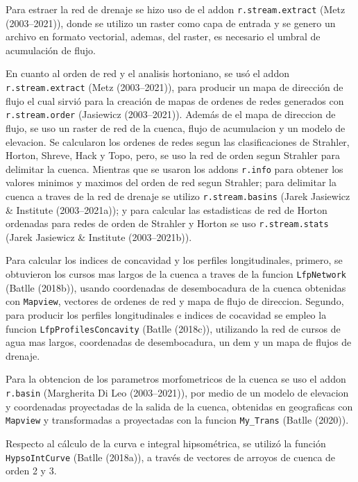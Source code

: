 \documentclass[11pt,]{article}
\begin{document}
Para estraer la red de drenaje se hizo uso de el addon
\texttt{r.stream.extract} (Metz (2003--2021)), donde se utilizo un
raster como capa de entrada y se genero un archivo en formato vectorial,
ademas, del raster, es necesario el umbral de acumulación de flujo.

En cuanto al orden de red y el analisis hortoniano, se usó el addon
\texttt{r.stream.extract} (Metz (2003--2021)), para producir un mapa de
dirección de flujo el cual sirvió para la creación de mapas de ordenes
de redes generados con \texttt{r.stream.order} (Jasiewicz (2003--2021)).
Además de el mapa de direccion de flujo, se uso un raster de red de la
cuenca, flujo de acumulacion y un modelo de elevacion. Se calcularon los
ordenes de redes segun las clasificaciones de Strahler, Horton, Shreve,
Hack y Topo, pero, se uso la red de orden segun Strahler para delimitar
la cuenca. Mientras que se usaron los addons \texttt{r.info} para
obtener los valores minimos y maximos del orden de red segun Strahler;
para delimitar la cuenca a traves de la red de drenaje se utilizo
\texttt{r.stream.basins} (Jarek Jasiewicz \& Institute (2003--2021a)); y
para calcular las estadisticas de red de Horton ordenadas para redes de
orden de Strahler y Horton se uso \texttt{r.stream.stats} (Jarek
Jasiewicz \& Institute (2003--2021b)).

Para calcular los indices de concavidad y los perfiles longitudinales,
primero, se obtuvieron los cursos mas largos de la cuenca a traves de la
funcion \texttt{LfpNetwork} (Batlle (2018b)), usando coordenadas de
desembocadura de la cuenca obtenidas con \texttt{Mapview}, vectores de
ordenes de red y mapa de flujo de direccion. Segundo, para producir los
perfiles longitudinales e indices de cocavidad se empleo la funcion
\texttt{LfpProfilesConcavity} (Batlle (2018c)), utilizando la red de
cursos de agua mas largos, coordenadas de desembocadura, un dem y un
mapa de flujos de drenaje.

Para la obtencion de los parametros morfometricos de la cuenca se uso el
addon \texttt{r.basin} (Margherita Di Leo (2003--2021)), por medio de un
modelo de elevacion y coordenadas proyectadas de la salida de la cuenca,
obtenidas en geograficas con \texttt{Mapview} y transformadas a
proyectadas con la funcion \texttt{My\_Trans} (Batlle (2020)).

Respecto al cálculo de la curva e integral hipsométrica, se utilizó la
función \texttt{HypsoIntCurve} (Batlle (2018a)), a través de vectores de
arroyos de cuenca de orden 2 y 3.
\end{document}
